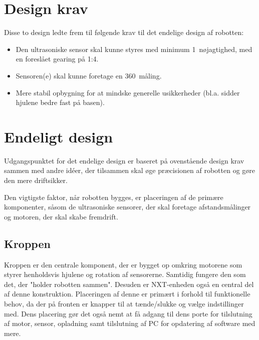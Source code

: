 \section{Design krav}
Disse to design ledte frem til følgende krav til det endelige design af robotten:

\begin{itemize}
\item Den ultrasoniske sensor skal kunne styres med  minimum 1\degree~nøjagtighed, med en foreslået gearing på 1:4.
\item Sensoren(e) skal kunne foretage en 360\degree~måling.
\item Mere stabil opbygning for at mindske generelle usikkerheder (bl.a. sidder hjulene bedre fast på basen).
\end{itemize} 


\section{Endeligt design}
Udgangspunktet for det endelige design er baseret på ovenstående design krav sammen med andre idéer, der tilsammen skal øge præcisionen af robotten og gøre den mere driftsikker.

Den vigtigste faktor, når robotten bygges, er placeringen af de primære komponenter, såsom de ultrasoniske sensorer, der skal foretage afstandsmålinger og motoren, der skal skabe fremdrift.

\subsection{Kroppen}
Kroppen er den centrale komponent, der er bygget op omkring motorene som styrer henholdsvis hjulene og rotation af sensorerne. 
Samtidig fungere den som det, der "holder robotten sammen".
Desuden er NXT-enheden også en central del af denne konstruktion.
Placeringen af denne er primært i forhold til funktionelle behov, da der på fronten er knapper til at tænde/slukke og vælge indstillinger med.
Dens placering gør det også nemt at få adgang til dens porte for tilslutning af motor, sensor, opladning samt tilslutning af PC for opdatering af software med mere.

